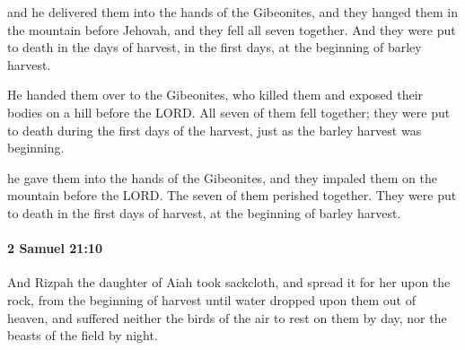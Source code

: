 			\begin{versebox}
					\item[BHS] 
					\item[ASV] and he delivered them into the hands of the Gibeonites, and they hanged them in the mountain before Jehovah, and they fell all seven together. And they were put to death in the days of harvest, in the first days, at the beginning of barley harvest.
					\item[NIV] He handed them over to the Gibeonites, who killed them and exposed their bodies on a hill before the LORD. All seven of them fell together; they were put to death during the first days of the harvest, just as the barley harvest was beginning.
					\item[NRSV] he gave them into the hands of the Gibeonites, and they impaled them on the mountain before the LORD. The seven of them perished together. They were put to death in the first days of harvest, at the beginning of barley harvest.
			\end{versebox}

		\paragraph{2 Samuel 21:10} %
			\label{2SAMUEL-21-10}

			And Rizpah the daughter of Aiah took sackcloth, and spread it for her upon the rock, from the beginning of harvest until water dropped upon them out of heaven, and suffered neither the birds of the air to rest on them by day, nor the beasts of the field by night.

